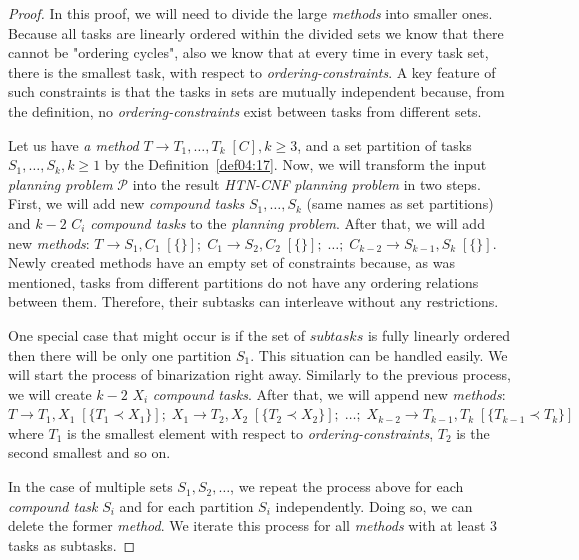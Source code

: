 \begin{proof}
     In this proof, we will need to divide the large \emph{methods} into smaller ones. Because all tasks are linearly ordered within the divided sets we know that there cannot be "ordering cycles", also we know that at every time in every task set, there is the smallest task, with respect to \emph{ordering-constraints}. A key feature of such constraints is that the tasks in sets are mutually independent because, from the definition, no \emph{ordering-constraints} exist between tasks from different sets. 

     Let us have \emph{a method} $T \rightarrow T_1, \dots, T_k \; [C], k \geq 3$, and a set partition of tasks $S_1, \dots, S_k, k \geq 1$ by the Definition~\ref{def04:17}. Now, we will transform the input \emph{planning problem} $\mathcal{P}$ into the result \emph{HTN-CNF} \emph{planning problem} in two steps. First, we will add new \emph{compound tasks} $S_1, \dots, S_k$ (same names as set partitions) and $k - 2$ $C_i$ \emph{compound tasks} to the \emph{planning problem}. After that, we will add new \emph{methods}: $T \rightarrow S_1, C_1 \; [\{\}]; \; C_1 \rightarrow S_2, C_2 \; [\{\}]; \; \dots; \; C_{k - 2} \rightarrow S_{k - 1}, S_k \; [\{\}]$. Newly created methods have an empty set of constraints because, as was mentioned, tasks from different partitions do not have any ordering relations between them. Therefore, their subtasks can interleave without any restrictions. 
     
     One special case that might occur is if the set of $subtasks$ is fully linearly ordered then there will be only one partition $S_1$. This situation can be handled easily. We will start the process of binarization right away. Similarly to the previous process, we will create $k - 2$ $X_i$ \emph{compound tasks}. After that, we will append new \emph{methods}: $T \rightarrow T_1, X_1 \; [\{T_1 \prec X_1\}]; \; X_1 \rightarrow T_2, X_2 \; [\{T_2 \prec X_2\}]; \; \dots; \; X_{k - 2} \rightarrow T_{k - 1}, T_k \; [\{T_{k - 1} \prec T_k\}]$ where $T_1$ is the smallest element with respect to \emph{ordering-constraints}, $T_2$ is the second smallest and so on.

     In the case of multiple sets $S_1, S_2, \dots$, we repeat the process above for each \emph{compound task} $S_i$ and for each partition $S_i$ independently. Doing so, we can delete the former \emph{method}. We iterate this process for all \emph{methods} with at least 3 tasks as subtasks.
\end{proof}

